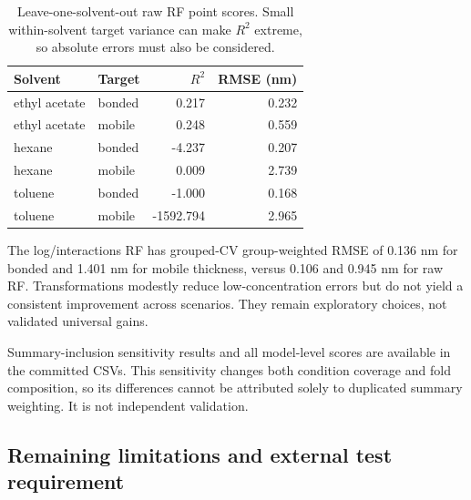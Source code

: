\begin{table}[H]\centering\small

\caption{Leave-one-solvent-out raw RF point scores. Small within-solvent target variance can make $R^2$ extreme, so absolute errors must also be considered.}

\begin{tabular}{llrr}\toprule Solvent & Target & $R^2$ & RMSE (nm) \\\midrule

ethyl acetate & bonded & 0.217 & 0.232 \\

ethyl acetate & mobile & 0.248 & 0.559 \\

hexane & bonded & -4.237 & 0.207 \\

hexane & mobile & 0.009 & 2.739 \\

toluene & bonded & -1.000 & 0.168 \\

toluene & mobile & -1592.794 & 2.965 \\

\bottomrule\end{tabular}\end{table}



The log/interactions RF has grouped-CV group-weighted RMSE of 0.136 nm for bonded and 1.401 nm for mobile thickness, versus 0.106 and 0.945 nm for raw RF. Transformations modestly reduce low-concentration errors but do not yield a consistent improvement across scenarios. They remain exploratory choices, not validated universal gains.

Summary-inclusion sensitivity results and all model-level scores are available in the committed CSVs. This sensitivity changes both condition coverage and fold composition, so its differences cannot be attributed solely to duplicated summary weighting. It is not independent validation.

\subsection{Remaining limitations and external test requirement}

